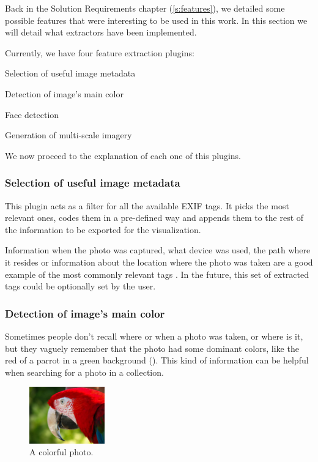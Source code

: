 Back in the Solution Requirements chapter (\ref{s:features}), we detailed some possible features that were interesting to be used in this work. In this section we will detail what extractors have been implemented.

Currently, we have four feature extraction plugins:
\begin{myitemize}
	\item Selection of useful image metadata
	\item Detection of image’s main color
	\item Face detection
	\item Generation of multi-scale imagery
\end{myitemize}

We now proceed to the explanation of each one of this plugins. 

\subsubsection{Selection of useful image metadata}

This plugin acts as a filter for all the available \ac{EXIF} tags. It picks the most relevant ones, codes them in a pre-defined way and appends them to the rest of the information to be exported for the visualization.

Information when the photo was captured, what device was used, the path where it resides or information about the location where the photo was taken are a good example of the most commonly relevant tags . In the future, this set of extracted tags could be optionally set by the user.


\subsubsection{Detection of image’s main color}

Sometimes people don’t recall where or when a photo was taken, or where is it, but they vaguely remember that the photo had some dominant colors, like the red of a parrot in a green background (). This kind of information can be helpful when searching for a photo in a collection.

\begin{figure}
	\vspace{-20pt}
	\begin{center}
		\includegraphics[width=0.29\textwidth]{Figures/parrot}
	\end{center}
	\vspace{-20pt}
	\caption{A colorful photo.}
	\vspace{-5pt}
	\label{fig:parrot}
\end{figure}

